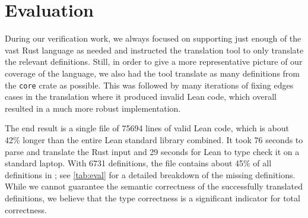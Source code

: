 \section{Evaluation}
\label{sec:eval}

During our verification work, we always focused on supporting just enough of the vast Rust
language as needed and instructed the translation tool to only translate the
relevant definitions. Still, in order to give a more representative picture of
our coverage of the language, we also had the tool translate as many definitions
from the \verb!core! crate as possible. This was followed by many iterations of
fixing edges cases in the translation where it produced invalid Lean code, which
overall resulted in a much more robust implementation.

The end result is a single file of 75694 lines of valid Lean code, which
is about 42\% longer than the entire Lean standard library combined.
It took 76 seconds to parse and translate the Rust input and 29 seconds for
Lean to type check it on a standard laptop. With 6731
definitions, the file contains about 45\% of all definitions in ; see
\autoref{tab:eval} for a detailed breakdown of the missing definitions. While we
cannot guarantee the semantic correctness of the successfully translated
definitions, we believe that the type correctness is a significant indicator
for total correctness.

